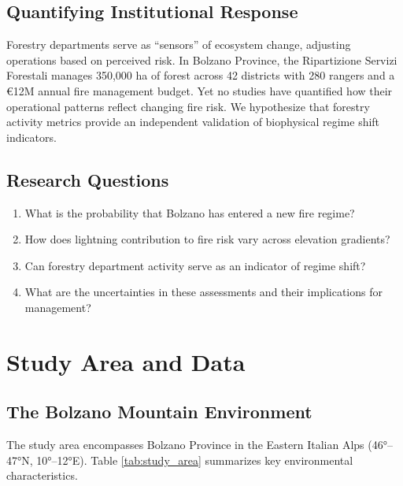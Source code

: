 \documentclass[11pt,a4paper]{article}
\begin{document}
\subsection{Quantifying Institutional Response}

Forestry departments serve as ``sensors'' of ecosystem change, adjusting operations based on perceived risk. In Bolzano Province, the Ripartizione Servizi Forestali manages 350,000 ha of forest across 42 districts with 280 rangers and a €12M annual fire management budget. Yet no studies have quantified how their operational patterns reflect changing fire risk. We hypothesize that forestry activity metrics provide an independent validation of biophysical regime shift indicators.

\subsection{Research Questions}

\begin{enumerate}
    \item What is the probability that Bolzano has entered a new fire regime?
    \item How does lightning contribution to fire risk vary across elevation gradients?
    \item Can forestry department activity serve as an indicator of regime shift?
    \item What are the uncertainties in these assessments and their implications for management?
\end{enumerate}

\section{Study Area and Data}

\subsection{The Bolzano Mountain Environment}

The study area encompasses Bolzano Province in the Eastern Italian Alps (46°--47°N, 10°--12°E). Table \ref{tab:study_area} summarizes key environmental characteristics.
\end{document}
